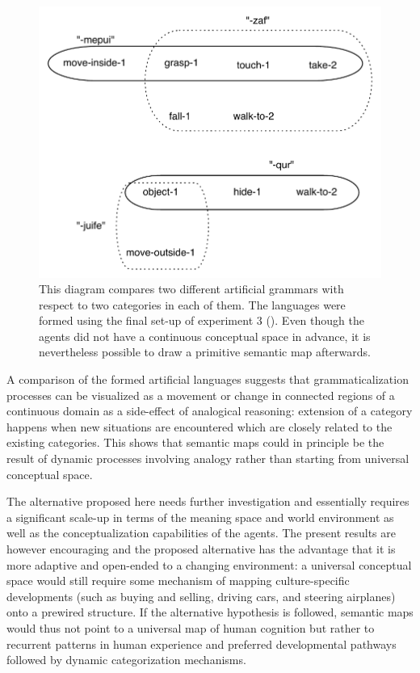\begin{figure}[t]
\centerline{\includegraphics[scale=0.7]{Chapter5/figs/sem-map1}}
  \caption[Two ``semantic maps'' from the experiments]{This diagram compares two different artificial grammars with respect to two categories in each of them. The languages were formed using the final set-up of experiment 3 (). Even though the agents did not have a continuous conceptual space in advance, it is nevertheless possible to draw a primitive semantic map afterwards.}
   \label{f:semmap-1}
\end{figure}


A comparison of the formed artificial languages suggests that grammaticalization processes can be visualized as a movement or change in connected regions of a continuous domain as a side-effect of analogical reasoning: extension of a category happens when new situations are encountered which are closely related to the existing categories. This shows that semantic maps could in principle be the result of dynamic processes involving analogy rather than starting from universal conceptual space.

The alternative proposed here needs further investigation and essentially requires a significant scale-up in terms of the meaning space and world environment as well as the conceptualization capabilities of the agents. The present results are however encouraging and the proposed alternative has the advantage that it is more adaptive and open-ended to a changing environment: a universal conceptual space would still require some mechanism of mapping culture-specific developments (such as buying and selling, driving cars, and steering airplanes) onto a prewired structure. If the alternative hypothesis is followed, semantic maps would thus not point to a universal map of human cognition but rather to recurrent patterns in human experience and preferred developmental pathways followed by dynamic categorization mechanisms.

